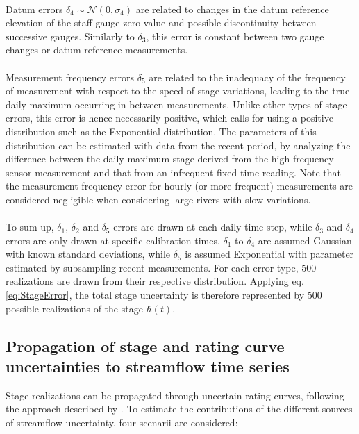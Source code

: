 \documentclass[11pt]{article}
\begin{document}
    \paragraph{}Datum errors $\delta_4  \sim \mathcal{N}(0,\sigma_4)$ are related to changes in the datum reference elevation of the staff gauge zero value and possible discontinuity between successive gauges. Similarly to $\delta_3$, this error is constant between two gauge changes or datum reference measurements. 
    
    \paragraph{}Measurement frequency errors $\delta_5$ are related to the inadequacy of the frequency of measurement with respect to the speed of stage variations, leading to the true daily maximum occurring in between measurements. Unlike other types of stage errors, this error is hence necessarily positive, which calls for using a positive distribution such as the Exponential distribution. The parameters of this distribution can be estimated with data from the recent period, by analyzing the difference between the daily maximum stage derived from the high-frequency sensor measurement and that from an infrequent fixed-time reading. Note that the measurement frequency error for hourly (or more frequent) measurements are considered negligible when considering large rivers with slow variations. 
      
    \paragraph{}
    To sum up, $\delta_1$, $\delta_2$ and $\delta_5$ errors are drawn at each daily time step, while $\delta_3$ and $\delta_4$ errors are only drawn at specific calibration times. $\delta_1$ to $\delta_4$ are assumed Gaussian with known standard deviations, while $\delta_5$ is assumed Exponential with parameter estimated by subsampling recent measurements. For each error type, 500 realizations are drawn from their respective distribution. Applying eq. \ref{eq:StageError}, the total stage uncertainty is therefore represented by 500 possible realizations of the stage $\hbar(t)$.
   
   \subsection{Propagation of stage and rating curve uncertainties to streamflow time series}
   \label{subsec:PropagStage}
   Stage realizations can be propagated through uncertain rating curves, following the approach described by \citet{horner_impact_2018}. To estimate the contributions of the different sources of streamflow uncertainty, four scenarii are considered:
   
\end{document}
